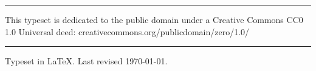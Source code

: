 \documentclass[
paper=5.5in:8.5in,
BCOR=7mm,
twoside,
DIV=calc,
11pt,
usegeometry,
chapterprefix,
headings=big]{scrbook} %
\begin{document}
\rule{0.5\textwidth}{.4pt}


This typeset is dedicated to the public domain under a Creative Commons CC0 1.0 Universal deed: creativecommons.org/publicdomain/zero/1.0/\\

\rule{0.5\textwidth}{.4pt}

Typeset in \LaTeX{}. Last revised \today.
\enlargethispage{2\baselineskip}
\thispagestyle{empty}
\end{document}
